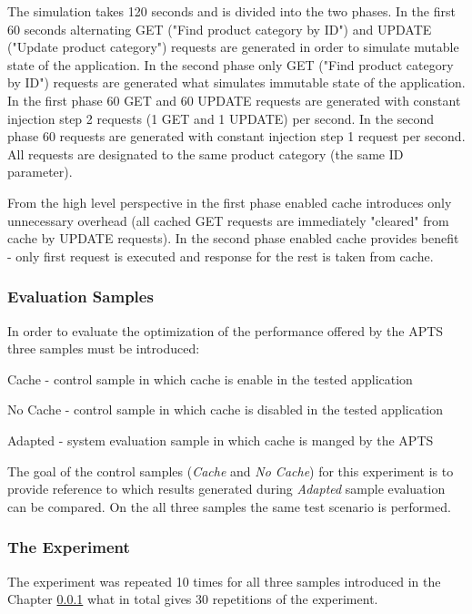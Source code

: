 \documentclass[12pt,a4paper]{article}
\let\tempone\itemize
\let\temptwo\enditemize
\renewenvironment{itemize}{\tempone\addtolength{\itemsep}{-0.4\baselineskip}}{\temptwo}
\begin{document}
The simulation takes 120 seconds and is divided into the two phases. In the first 60 seconds alternating GET ("Find product category by ID") and UPDATE ("Update product category") requests are generated in order to simulate mutable state of the application. In the second phase only GET ("Find product category by ID") requests are generated what simulates immutable state of the application. In the first phase 60 GET and 60 UPDATE requests are generated with constant injection step 2 requests (1 GET and 1 UPDATE) per second. In the second phase 60 requests are generated with constant injection step 1 request per second. All requests are designated to the same product category (the same ID parameter). 

From the high level perspective in the first phase enabled cache introduces only unnecessary overhead (all cached GET requests are immediately "cleared" from cache by UPDATE requests). In the second phase enabled cache provides benefit - only first request is executed and response for the rest is taken from cache.  

\subsubsection{Evaluation Samples} \label{evaluationsamplescache}

In order to evaluate the optimization of the performance offered by the APTS three  samples must be introduced: 
\begin{itemize}
\item Cache - control sample in which cache is enable in the tested application
\item No Cache - control sample in which cache is disabled in the tested application
\item Adapted - system evaluation sample in which cache is manged by the APTS
\end{itemize}

The goal of the control samples (\textit{Cache} and \textit{No Cache}) for this experiment is to provide reference to which results generated during \textit{Adapted} sample evaluation can be compared. On the all three samples the same test scenario is performed. 



\subsubsection{The Experiment} 

The experiment was repeated 10 times for all three samples introduced in the Chapter \ref{evaluationsamplescache} what in total gives 30 repetitions of the experiment.
\end{document}

